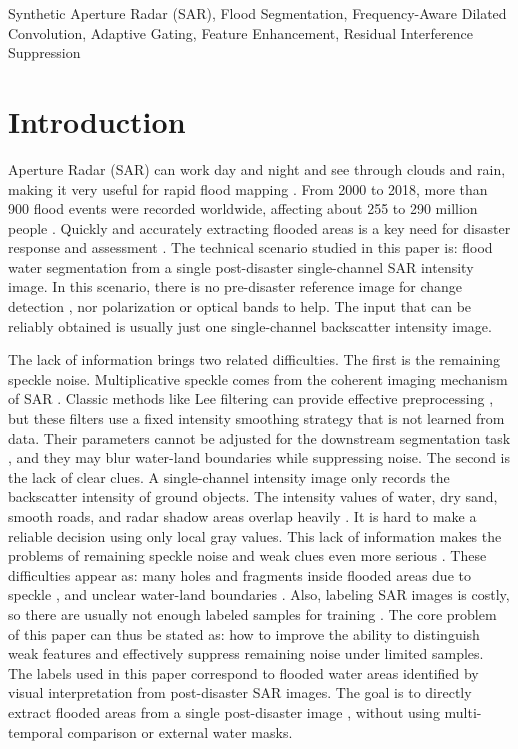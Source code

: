 \documentclass[lettersize,journal]{IEEEtran}
\begin{document}
\begin{IEEEkeywords}
Synthetic Aperture Radar (SAR), Flood Segmentation, Frequency-Aware Dilated Convolution, Adaptive Gating, Feature Enhancement, Residual Interference Suppression
\end{IEEEkeywords}



\section{Introduction}

 Aperture Radar (SAR) can work day and night and see through clouds and rain, making it very useful for rapid flood mapping \cite{Amitrano2024RemoteSens}. From 2000 to 2018, more than 900 flood events were recorded worldwide, affecting about 255 to 290 million people \cite{Tellman2021Nature}. Quickly and accurately extracting flooded areas is a key need for disaster response and assessment \cite{Lv2022RemoteSens}. The technical scenario studied in this paper is: flood water segmentation from a single post-disaster single-channel SAR intensity image. In this scenario, there is no pre-disaster reference image for change detection \cite{Bai2021RemoteSens}, nor polarization or optical bands to help. The input that can be reliably obtained is usually just one single-channel backscatter intensity image.

The lack of information brings two related difficulties. The first is the remaining speckle noise. Multiplicative speckle comes from the coherent imaging mechanism of SAR \cite{Wang2025JSTARS_Speckle}. Classic methods like Lee filtering can provide effective preprocessing \cite{Farhadiani2024ISPRS}, but these filters use a fixed intensity smoothing strategy that is not learned from data. Their parameters cannot be adjusted for the downstream segmentation task \cite{Zhao2024JSTARS_Filter}, and they may blur water-land boundaries while suppressing noise. The second is the lack of clear clues. A single-channel intensity image only records the backscatter intensity of ground objects. The intensity values of water, dry sand, smooth roads, and radar shadow areas overlap heavily \cite{Ritushree2023MIGARS, Liu2022JSTARS, Tian2022RemoteSens}. It is hard to make a reliable decision using only local gray values. This lack of information makes the problems of remaining speckle noise and weak clues even more serious \cite{Huang2024JSTARS}. These difficulties appear as: many holes and fragments inside flooded areas due to speckle \cite{Gao2025AppSci}, and unclear water-land boundaries \cite{Zhao2024MGRS}. Also, labeling SAR images is costly, so there are usually not enough labeled samples for training \cite{Zortea2023IEEE}. The core problem of this paper can thus be stated as: how to improve the ability to distinguish weak features and effectively suppress remaining noise under limited samples. The labels used in this paper correspond to flooded water areas identified by visual interpretation from post-disaster SAR images. The goal is to directly extract flooded areas from a single post-disaster image \cite{Amer2025RemoteSens}, without using multi-temporal comparison or external water masks.
\end{document}
